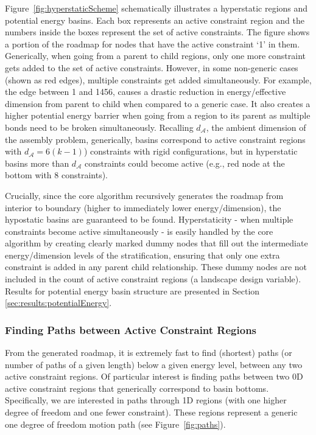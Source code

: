 \documentclass[]{article}
\newcommand{\figref}[1]{Figure~\ref{#1}}
\begin{document}
\figref{fig:hyperstaticScheme} 
schematically illustrates a hyperstatic regions and potential energy basins.
Each box represents an active constraint region and the numbers inside the
boxes represent the set of active constraints. The figure shows a portion of
the roadmap for nodes that have the active constraint `1' in them. Generically,
when going from a parent to child regions, only one more constraint gets added
to the set of active constraints.
However, in some
non-generic cases (shown as red edges), multiple constraints get added 
simultaneously. For example, the edge between 1 and
1456, causes a drastic reduction in energy/effective dimension from parent to
child when compared to a generic case. It also creates a higher potential
energy barrier when going from a region to its parent as multiple bonds need to
be broken simultaneously. Recalling $d_\mathcal{A}$, the ambient 
dimension of the assembly problem, generically, basins correspond to active constraint
regions with $d_\mathcal{A} =  6(k-1)$) constraints with rigid configurations,
but in hyperstatic basins more than $d_\mathcal{A}$ constraints could become
active (e.g., red node at the bottom with 8 constraints).

Crucially, since the core algorithm recursively generates the roadmap from
interior to boundary (higher to immediately lower energy/dimension), the
hypostatic basins are guaranteed to be found.  Hyperstaticity - when multiple
constraints become active simultaneously - is easily handled by the core
algorithm by creating clearly marked dummy nodes that fill out the intermediate
energy/dimension levels of the stratification, ensuring that only one extra
constraint is added in any parent child relationship.  These dummy nodes are
not included in the count of active constraint regions (a landscape design
variable). Results for potential energy basin structure are presented in
Section \ref{sec:results:potentialEnergy}.

\subsubsection{Finding Paths between Active Constraint Regions}
\label{sec:methods:ConfPaths}
From the generated roadmap, it is extremely fast to find (shortest) paths (or
number of paths of a given length) below a given energy level, between any two
active constraint regions.  Of particular interest is finding paths between two
0D active constraint regions that generically correspond to basin bottoms.
Specifically, we are interested in paths through 1D regions (with one higher
degree of freedom and one fewer constraint). These regions represent a generic
one degree of freedom motion path (see \figref{fig:paths}). 
\end{document}
